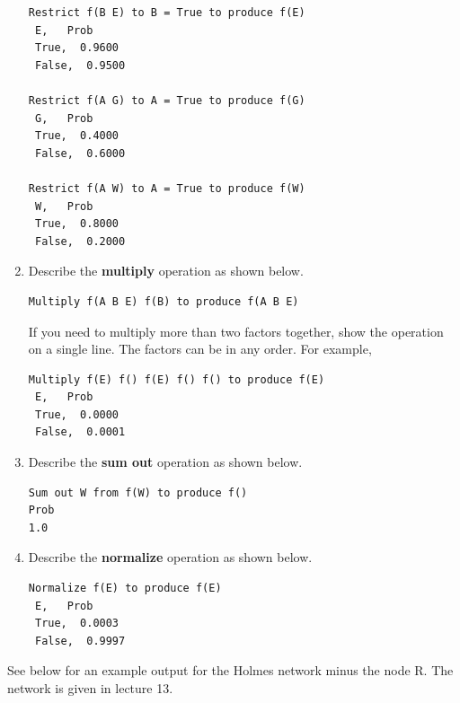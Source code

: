 \documentclass[12pt]{article}
\begin{document}
\begin{enumerate}
\begin{verbatim}
Restrict f(B E) to B = True to produce f(E)
 E,   Prob
 True,  0.9600
 False,  0.9500

Restrict f(A G) to A = True to produce f(G)
 G,   Prob
 True,  0.4000
 False,  0.6000

Restrict f(A W) to A = True to produce f(W)
 W,   Prob
 True,  0.8000
 False,  0.2000

\end{verbatim}

\item
Describe the {\bf multiply} operation as shown below.
%
\begin{verbatim}
Multiply f(A B E) f(B) to produce f(A B E)
\end{verbatim}

If you need to multiply more than two factors together, show the operation on a single line. The factors can be in any order. For example,
%
\begin{verbatim}
Multiply f(E) f() f(E) f() f() to produce f(E)
 E,   Prob
 True,  0.0000
 False,  0.0001
\end{verbatim}

\item
Describe the {\bf sum out} operation as shown below.
%
\begin{verbatim}
Sum out W from f(W) to produce f()
Prob
1.0
\end{verbatim}

\item
Describe the {\bf normalize} operation as shown below.
%
\begin{verbatim}
Normalize f(E) to produce f(E)
 E,   Prob
 True,  0.0003
 False,  0.9997
\end{verbatim}

\end{enumerate}

See below for an example output for the Holmes network minus the node R. The network is given in lecture 13.
\end{document}
